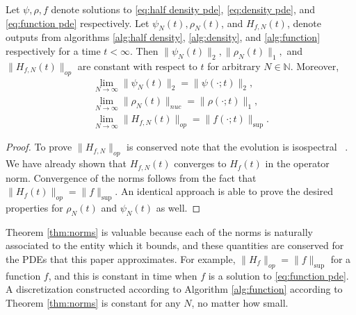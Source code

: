 \documentclass[final,leqno]{siamart}
\newcommand{\ram}[1]{{\normalsize{\textbf{({\color{red}RAMBO:\ }#1)}}}}
\begin{document}
\begin{theorem} \label{thm:norms}
	Let $\psi,\rho,f$ denote solutions to \eqref{eq:half density pde}, \eqref{eq:density pde}, and \eqref{eq:function pde} respectively.
	Let $\psi_{N}(t),\rho_{N}(t)$, and $H_{f,N}(t)$, denote outputs from algorithms \ref{alg:half density}, \ref{alg:density}, and \ref{alg:function} respectively for a time $t < \infty$.
	Then $\| \psi_{N} (t)\|_{2}, \|\rho_{N}(t)\|_{1},$ and $\| H_{f,N}(t) \|_{op}$ are constant with respect to $t$ for arbitrary $N \in \mathbb{N}$.
	Moreover,
	\begin{align*}
		\lim_{N \to \infty} \| \psi_{N} (t) \|_{2} = \| \psi(\cdot; t) \|_{2}, \\
		\lim_{N \to \infty} \| \rho_{N}(t) \|_{nuc} = \| \rho(\cdot; t) \|_{1}, \\
		\lim_{N \to \infty} \| H_{f,N}(t) \|_{op} = \| f( \cdot ;t) \|_{\sup}.
	\end{align*}
\end{theorem}
\begin{proof}
	To prove $\| H_{f,N} \|_{op}$ is conserved note that the evolution is isospectral ~\cite{Calvo1997}.
	We have already shown that $H_{f,N}(t)$ converges to $H_{f}(t)$ in the operator norm.
	Convergence of the norms follows from the fact that $\| H_{f}(t) \|_{op} = \| f \|_{\sup}$.
	An identical approach is able to prove the desired properties for $\rho_{N}(t)$ and $\psi_{N}(t)$ as well.
\end{proof}

Theorem \ref{thm:norms} is valuable because each of the norms is naturally associated to the entity which it bounds, and these quantities are conserved for the PDEs that this paper approximates.
For example, $\| H_{f} \|_{op} = \| f \|_{\sup}$ for a function $f$, and this is constant in time when $f$ is a solution to \eqref{eq:function pde}.
A discretization constructed according to Algorithm \ref{alg:function} according to Theorem \ref{thm:norms} is constant for any $N$, no matter how small.
\end{document}
